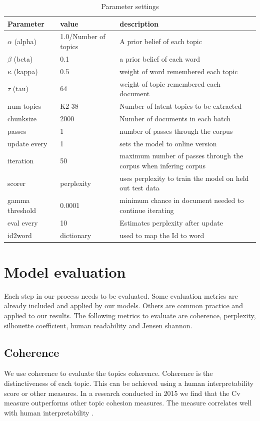 \begin{table}[h]
\centering
 \begin{tabular}{|l|l| l|} 
 \hline
 Parameter & value & description \\ 
 \hline
 \hline
 $\alpha$ (alpha) & 1.0/Number of topics & A prior belief of each topic \\ 
 $\beta$ (beta) & 0.1 & a prior belief of each word  \\
 $\kappa$ (kappa) & 0.5 & weight of word remembered each topic \\
 $\tau$ (tau) & 64 & weight of topic remembered each document\\
 num topics & K{2-38}& Number of latent topics to be extracted\\
 chunksize & 2000 & Number of documents in each batch\\
 passes & 1 & number of passes through the corpus\\
 update every & 1 & sets the model to online version\\
 iteration & 50 & maximum number of passes through the corpus when infering corpus\\
 scorer & perplexity & uses perplexity to train the model on held out test data\\
 gamma threshold & 0.0001 & minimum chance in document needed to continue iterating\\
 eval every & 10 & Estimates perplexity after update\\
 id2word & dictionary & used to map the Id to word \\
 \hline
 \end{tabular}
\caption{Parameter settings}
\label{tab:tableparset}
\end{table}

\section{Model evaluation}\label{methodology:evaluation measures}
Each step in our process needs to be evaluated. Some evaluation metrics are already included and applied by our models. Others are common practice and applied to our results. The following metrics to evaluate are coherence, perplexity, silhouette coefficient, human readability and Jensen shannon.

\subsection{Coherence}\label{methodology:coherence c_v}
We use coherence to evaluate the topics coherence. Coherence is the distinctiveness of each topic. This can be achieved using a human interpretability score \cite{Chang2009} or other measures. In a research conducted in 2015 we find that the Cv measure outperforms other topic cohesion measures. The measure correlates well with human interpretability \cite{Roder2015}.

